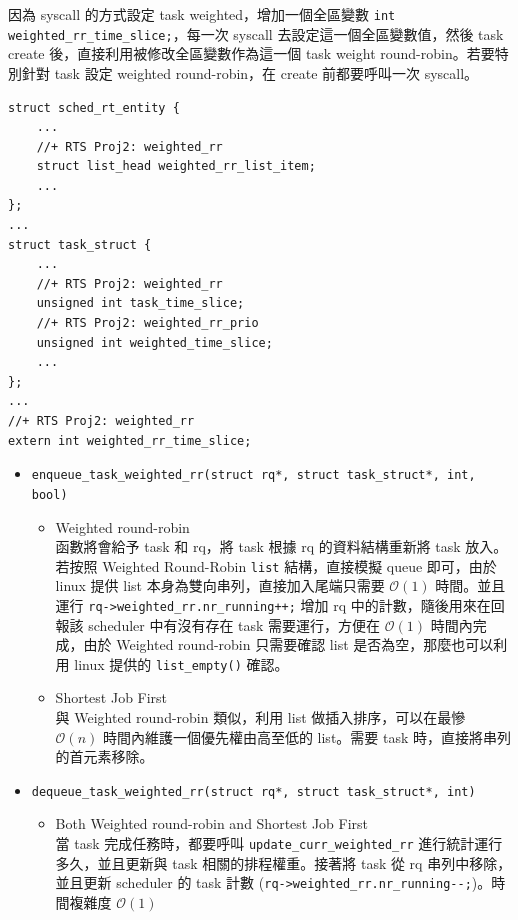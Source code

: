 \documentclass{res}
\begin{document}
\begin{resume}
因為 syscall 的方式設定 task weighted，增加一個全區變數 \lstinline{int weighted_rr_time_slice;}，每一次 syscall 去設定這一個全區變數值，然後 task create 後，直接利用被修改全區變數作為這一個 task weight round-robin。若要特別針對 task 設定 weighted round-robin，在 create 前都要呼叫一次 syscall。

\begin{lstlisting}[frame=single]
struct sched_rt_entity {
    ...
    //+ RTS Proj2: weighted_rr
    struct list_head weighted_rr_list_item;
    ...
};
...
struct task_struct {
    ...
    //+ RTS Proj2: weighted_rr
    unsigned int task_time_slice;
    //+ RTS Proj2: weighted_rr_prio
    unsigned int weighted_time_slice;
    ...
};
...
//+ RTS Proj2: weighted_rr
extern int weighted_rr_time_slice;
\end{lstlisting}

\vspace*{.1in} 

\begin{itemize}
	\item	
	\lstinline{enqueue_task_weighted_rr(struct rq*, struct task_struct*, int, bool)}
	\begin{itemize}
		\item Weighted round-robin \\
	函數將會給予 task 和 rq，將 task 根據 rq 的資料結構重新將 task 放入。若按照 Weighted Round-Robin \lstinline{list} 結構，直接模擬 queue 即可，由於 linux 提供 list 本身為雙向串列，直接加入尾端只需要 $\mathcal{O}(1)$ 時間。並且運行 \lstinline{rq->weighted_rr.nr_running++;} 增加 rq 中的計數，隨後用來在回報該 scheduler 中有沒有存在 task 需要運行，方便在 $\mathcal{O}(1)$ 時間內完成，由於 Weighted round-robin 只需要確認 list 是否為空，那麼也可以利用 linux 提供的 \lstinline{list_empty()} 確認。
		\item Shortest Job First \\
		與 Weighted round-robin 類似，利用 list 做插入排序，可以在最慘 $\mathcal{O}(n)$ 時間內維護一個優先權由高至低的 list。需要 task 時，直接將串列的首元素移除。
	\end{itemize}
	
	\item
	\lstinline{dequeue_task_weighted_rr(struct rq*, struct task_struct*, int)} \\
	\begin{itemize}
		\item Both Weighted round-robin and Shortest Job First \\
		當 task 完成任務時，都要呼叫 \lstinline{update_curr_weighted_rr} 進行統計運行多久，並且更新與 task 相關的排程權重。接著將 task 從 rq 串列中移除，並且更新 scheduler 的 task 計數 (\lstinline{rq->weighted_rr.nr_running--;})。時間複雜度 $\mathcal{O}(1)$
	\end{itemize}
	

\end{itemize}
\end{resume}
\end{document}
